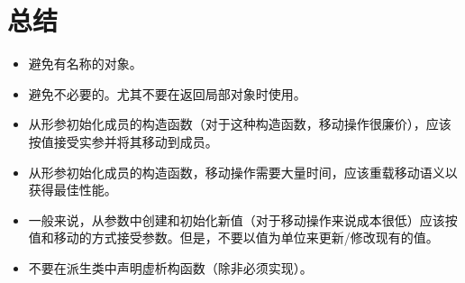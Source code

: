\section{总结}
\begin{itemize}
	\item 避免有名称的对象。
	\item 避免不必要的。尤其不要在返回局部对象时使用。
	\item 从形参初始化成员的构造函数（对于这种构造函数，移动操作很廉价），应该按值接受实参并将其移动到成员。
	\item 从形参初始化成员的构造函数，移动操作需要大量时间，应该重载移动语义以获得最佳性能。
	\item 一般来说，从参数中创建和初始化新值（对于移动操作来说成本很低）应该按值和移动的方式接受参数。但是，不要以值为单位来更新/修改现有的值。
	\item 不要在派生类中声明虚析构函数（除非必须实现）。
\end{itemize}


